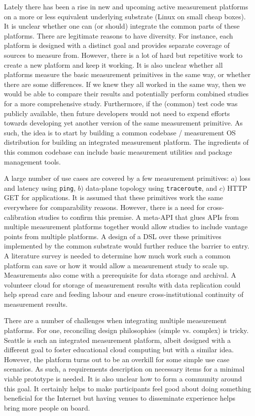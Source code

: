 Lately there has been a rise in new and upcoming active measurement platforms
\cite{vbajpai:comst:2015} on a more or less equivalent underlying substrate
(Linux on small cheap boxes). It is unclear whether one can (or should)
integrate the common parts of these platforms. There are legitimate reasons to
have diversity. For instance, each platform is designed with a distinct goal
and provides separate coverage of sources to measure from. However, there is a
lot of hard but repetitive work to create a new platform and keep it working.
It is also unclear whether all platforms measure the basic measurement
primitives in the same way, or whether there are some differences. If we knew
they all worked in the same way, then we would be able to compare their
results and potentially perform combined studies for a more comprehensive
study.  Furthermore, if the (common) test code was publicly available, then
future developers would not need to expend efforts towards developing yet
another version of the same measurement primitive.  As such, the idea is to
start by building a common codebase / measurement OS distribution for building
an integrated measurement platform.  The ingredients of this common codebase
can include basic measurement utilities and package management tools.

A large number of use cases are covered by a few measurement primitives: $a)$
loss and latency using \texttt{ping}, $b)$ data-plane topology using
\texttt{traceroute}, and $c)$ HTTP GET for applications. It is assumed that
these primitives work the same everywhere for comparability reasons.  However,
there is a need for cross-calibration studies to confirm this premise. A
meta-API that glues APIs from multiple measurement platforms together would
allow studies to include vantage points from multiple platforms. A design of a
\ac{DSL} over these primitives implemented by the common substrate would
further reduce the barrier to entry. A literature survey is needed to
determine how much work such a common platform can save or how it would allow
a measurement study to scale up.  Measurements also come with a prerequisite
for data storage and archival. A volunteer cloud for storage of measurement
results with data replication could help spread care and feeding labour and
ensure cross-institutional continuity of measurement results.

There are a number of challenges when integrating multiple measurement
platforms. For one, reconciling design philosophies (simple vs. complex) is
tricky. Seattle \cite{jcappos:sigcse:2009} is such an integrated measurement
platform, albeit designed with a different goal to foster educational cloud
computing but with a similar idea. However, the platform turns out to be an
overkill for some simple use case scenarios. As such, a requirements
description on necessary items for a minimal viable prototype is needed.  It
is also unclear how to form a community around this goal. It certainly helps
to make participants feel good about doing something beneficial for the
Internet but having venues to disseminate experience helps bring more people
on board.

